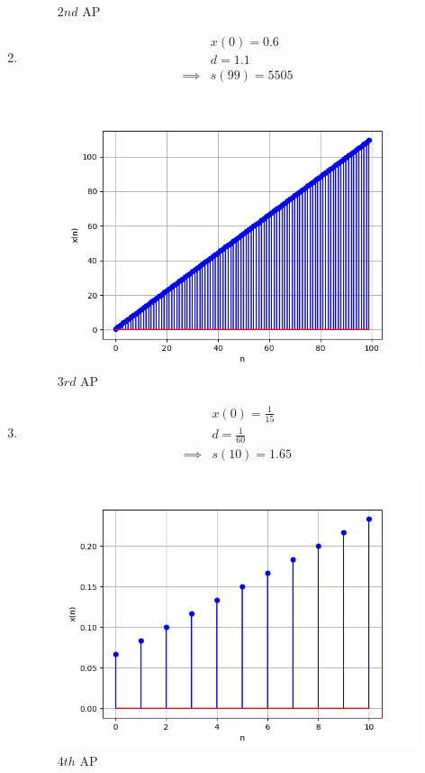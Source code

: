 \documentclass[journal,12pt,twocolumn]{IEEEtran}
\theoremstyle{remark}
\begin{document}
\begin{enumerate}[label=(\alph*)]
\begin{figure}[h!]
        \caption{$2nd$ AP}
    \end{figure}
    \item \begin{align}
        &x(0)=0.6 \\
        &d=1.1 \\
        \implies &s(99)=5505
    \end{align}
    \begin{figure}[h!]
        \centering
        \includegraphics[width=0.9\columnwidth]{figs/plt3.png}
        \caption{$3rd$ AP}
    \end{figure}
    \item \begin{align}
        &x(0)=\frac{1}{15} \\
        &d=\frac{1}{60} \\
        \implies &s(10)=1.65
    \end{align}
    \begin{figure}[h!]
        \centering
        \includegraphics[width=0.9\columnwidth]{figs/plt4.png}
        \caption{$4th$ AP}
    \end{figure}
\end{enumerate}
\end{document}
